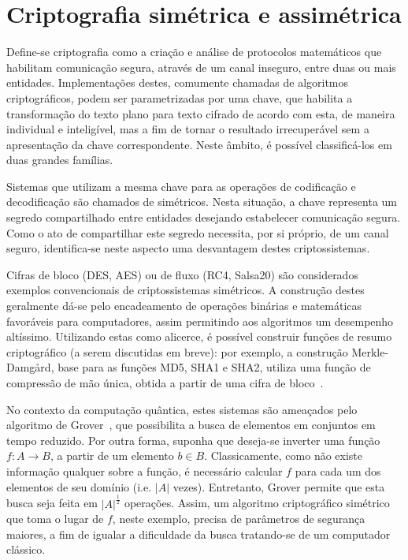 \documentclass[12pt]{report}
\newcommand{\length}[1]{\vert #1 \vert}
\begin{document}
\section{Criptografia simétrica e assimétrica}

Define-se criptografia como a criação e análise de protocolos
matemáticos que habilitam comunicação segura, através de um canal
inseguro, entre duas ou mais entidades. Implementações destes,
comumente chamadas de algoritmos criptográficos,
podem ser parametrizadas por uma chave, que habilita a transformação
do texto plano para texto cifrado de acordo
com esta, de maneira individual e inteligível, mas a fim de tornar o
resultado irrecuperável sem a apresentação da chave correspondente.
Neste âmbito, é possível classificá-los em duas grandes famílias.

Sistemas que utilizam a mesma chave para as operações de codificação
e decodificação são chamados de simétricos. Nesta situação, a chave
representa um segredo compartilhado entre entidades desejando
estabelecer comunicação segura. Como o ato de compartilhar
este segredo necessita, por si próprio, de um canal seguro,
identifica-se neste aspecto uma desvantagem destes criptossistemas.

Cifras de bloco (DES, AES) ou de fluxo (RC4, Salsa20) são
considerados exemplos convencionais de criptossistemas simétricos.
A construção destes geralmente dá-se pelo encadeamento de operações
binárias e matemáticas favoráveis para computadores, assim permitindo
aos algoritmos um desempenho altíssimo. Utilizando estas como alicerce,
é possível construir funções de resumo criptográfico (a serem discutidas
em breve): por exemplo, a construção Merkle-Damgård, base para as funções
MD5, SHA1 e SHA2, utiliza uma função de compressão de mão única, obtida
a partir de uma cifra de bloco~\cite[9.41]{Menezes:1996:HAC:548089}.

No contexto da computação quântica, estes sistemas são ameaçados
pelo algoritmo de Grover~\cite{Grover:1996:FQM:237814.237866}, que
possibilita a busca de elementos em conjuntos em tempo reduzido.
Por outra forma, suponha que deseja-se inverter uma função $f : A
\longrightarrow B$, a partir de um elemento $b \in B$. Classicamente,
como não existe informação qualquer sobre a função, é necessário
calcular $f$ para cada um dos elementos de seu domínio (i.e. $\length{A}$
vezes). Entretanto, Grover permite que esta busca seja feita em
$\length{A}^{\frac{1}{2}}$ operações. Assim, um algoritmo criptográfico simétrico
que toma o lugar de $f$, neste exemplo, precisa de parâmetros de segurança
maiores, a fim de igualar a dificuldade da busca tratando-se de um
computador clássico.
\end{document}
